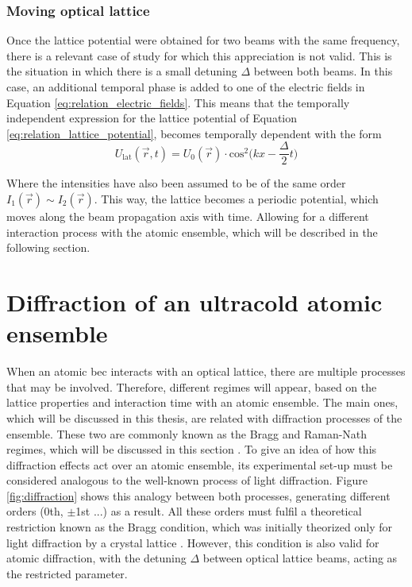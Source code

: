 \subsubsection{Moving optical lattice}

Once the lattice potential were obtained for two beams with the same frequency, there is a relevant case of study for which this appreciation is not valid. This is the situation in which there is a small detuning $\Delta$ between both beams. In this case, an additional temporal phase is added to one of the electric fields in Equation \eqref{eq:relation_electric_fields}. This means that the temporally independent expression for the lattice potential of Equation \eqref{eq:relation_lattice_potential}, becomes temporally dependent with the form
\begin{equation}\label{eq:relation_moving_lattice_potential}
	U_{\text{lat}}(\vec{r},t) = U_{0}(\vec{r}) \cdot \text{cos}^2\bigg(kx-\frac{\Delta}{2}t\bigg)
\end{equation} 

Where the intensities have also been assumed to be of the same order $I_{1}(\vec{r}) \sim I_{2}(\vec{r})$. This way, the lattice becomes a periodic potential, which moves along the beam propagation axis with time. Allowing for a different interaction process with the atomic ensemble, which will be described in the following section.


\section{Diffraction of an ultracold atomic ensemble}\label{sec:diffraction_atomic_ensemble}

When an atomic \ac{bec} interacts with an optical lattice, there are multiple processes that may be involved. Therefore, different regimes will appear, based on the lattice properties and interaction time with an atomic ensemble. The main ones, which will be discussed in this thesis, are related with diffraction processes of the ensemble. These two are commonly known as the Bragg and Raman-Nath regimes, which will be discussed in this section \cite{Mueller2008,Ovchinnikov1999}. To give an idea of how this diffraction effects act over an atomic ensemble, its experimental set-up must be considered analogous to the well-known process of light diffraction. Figure \ref{fig:diffraction} shows this analogy between both processes, generating different orders (0th, $\pm$1st ...) as a result. All these orders must fulfil a theoretical restriction known as the Bragg condition, which was initially theorized only for light diffraction by a crystal lattice \cite{Bragg1913}. However, this condition is also valid for atomic diffraction, with the detuning $\Delta$ between optical lattice beams, acting as the restricted parameter.


